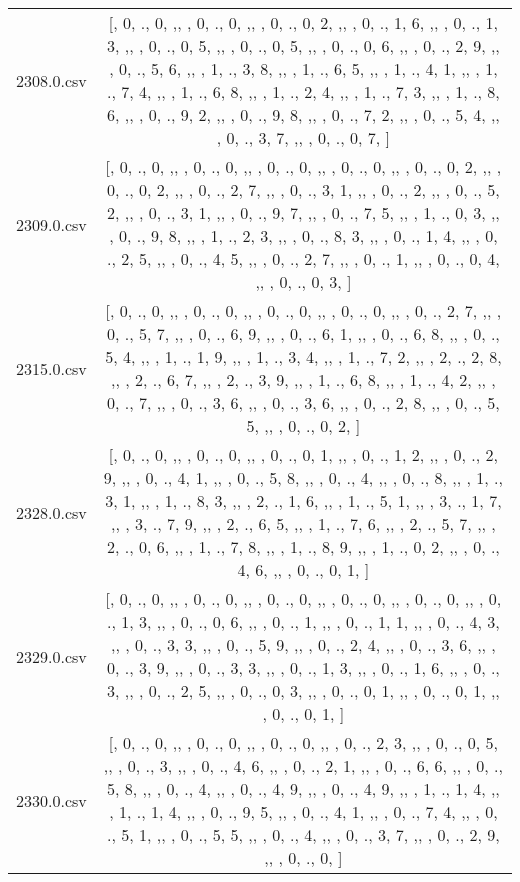 \begin{table}[ht]
\begin{tabular}{@{}c c@{}}
	2308.0.csv & [, 0, ., 0, ,,  , 0, ., 0, ,,  , 0, ., 0, 2, ,,  , 0, ., 1, 6, ,,  , 0, ., 1, 3, ,,  , 0, ., 0, 5, ,,  , 0, ., 0, 5, ,,  , 0, ., 0, 6, ,,  , 0, ., 2, 9, ,,  , 0, ., 5, 6, ,,  , 1, ., 3, 8, ,,  , 1, ., 6, 5, ,,  , 1, ., 4, 1, ,,  , 1, ., 7, 4, ,,  , 1, ., 6, 8, ,,  , 1, ., 2, 4, ,,  , 1, ., 7, 3, ,,  , 1, ., 8, 6, ,,  , 0, ., 9, 2, ,,  , 0, ., 9, 8, ,,  , 0, ., 7, 2, ,,  , 0, ., 5, 4, ,,  , 0, ., 3, 7, ,,  , 0, ., 0, 7, ]\\ 
	2309.0.csv & [, 0, ., 0, ,,  , 0, ., 0, ,,  , 0, ., 0, ,,  , 0, ., 0, ,,  , 0, ., 0, 2, ,,  , 0, ., 0, 2, ,,  , 0, ., 2, 7, ,,  , 0, ., 3, 1, ,,  , 0, ., 2, ,,  , 0, ., 5, 2, ,,  , 0, ., 3, 1, ,,  , 0, ., 9, 7, ,,  , 0, ., 7, 5, ,,  , 1, ., 0, 3, ,,  , 0, ., 9, 8, ,,  , 1, ., 2, 3, ,,  , 0, ., 8, 3, ,,  , 0, ., 1, 4, ,,  , 0, ., 2, 5, ,,  , 0, ., 4, 5, ,,  , 0, ., 2, 7, ,,  , 0, ., 1, ,,  , 0, ., 0, 4, ,,  , 0, ., 0, 3, ]\\ 
	2315.0.csv & [, 0, ., 0, ,,  , 0, ., 0, ,,  , 0, ., 0, ,,  , 0, ., 0, ,,  , 0, ., 2, 7, ,,  , 0, ., 5, 7, ,,  , 0, ., 6, 9, ,,  , 0, ., 6, 1, ,,  , 0, ., 6, 8, ,,  , 0, ., 5, 4, ,,  , 1, ., 1, 9, ,,  , 1, ., 3, 4, ,,  , 1, ., 7, 2, ,,  , 2, ., 2, 8, ,,  , 2, ., 6, 7, ,,  , 2, ., 3, 9, ,,  , 1, ., 6, 8, ,,  , 1, ., 4, 2, ,,  , 0, ., 7, ,,  , 0, ., 3, 6, ,,  , 0, ., 3, 6, ,,  , 0, ., 2, 8, ,,  , 0, ., 5, 5, ,,  , 0, ., 0, 2, ]\\ 
	2328.0.csv & [, 0, ., 0, ,,  , 0, ., 0, ,,  , 0, ., 0, 1, ,,  , 0, ., 1, 2, ,,  , 0, ., 2, 9, ,,  , 0, ., 4, 1, ,,  , 0, ., 5, 8, ,,  , 0, ., 4, ,,  , 0, ., 8, ,,  , 1, ., 3, 1, ,,  , 1, ., 8, 3, ,,  , 2, ., 1, 6, ,,  , 1, ., 5, 1, ,,  , 3, ., 1, 7, ,,  , 3, ., 7, 9, ,,  , 2, ., 6, 5, ,,  , 1, ., 7, 6, ,,  , 2, ., 5, 7, ,,  , 2, ., 0, 6, ,,  , 1, ., 7, 8, ,,  , 1, ., 8, 9, ,,  , 1, ., 0, 2, ,,  , 0, ., 4, 6, ,,  , 0, ., 0, 1, ]\\ 
	2329.0.csv & [, 0, ., 0, ,,  , 0, ., 0, ,,  , 0, ., 0, ,,  , 0, ., 0, ,,  , 0, ., 0, ,,  , 0, ., 1, 3, ,,  , 0, ., 0, 6, ,,  , 0, ., 1, ,,  , 0, ., 1, 1, ,,  , 0, ., 4, 3, ,,  , 0, ., 3, 3, ,,  , 0, ., 5, 9, ,,  , 0, ., 2, 4, ,,  , 0, ., 3, 6, ,,  , 0, ., 3, 9, ,,  , 0, ., 3, 3, ,,  , 0, ., 1, 3, ,,  , 0, ., 1, 6, ,,  , 0, ., 3, ,,  , 0, ., 2, 5, ,,  , 0, ., 0, 3, ,,  , 0, ., 0, 1, ,,  , 0, ., 0, 1, ,,  , 0, ., 0, 1, ]\\ 
	2330.0.csv & [, 0, ., 0, ,,  , 0, ., 0, ,,  , 0, ., 0, ,,  , 0, ., 2, 3, ,,  , 0, ., 0, 5, ,,  , 0, ., 3, ,,  , 0, ., 4, 6, ,,  , 0, ., 2, 1, ,,  , 0, ., 6, 6, ,,  , 0, ., 5, 8, ,,  , 0, ., 4, ,,  , 0, ., 4, 9, ,,  , 0, ., 4, 9, ,,  , 1, ., 1, 4, ,,  , 1, ., 1, 4, ,,  , 0, ., 9, 5, ,,  , 0, ., 4, 1, ,,  , 0, ., 7, 4, ,,  , 0, ., 5, 1, ,,  , 0, ., 5, 5, ,,  , 0, ., 4, ,,  , 0, ., 3, 7, ,,  , 0, ., 2, 9, ,,  , 0, ., 0, ]\\ 

\end{tabular}
\end{table}
